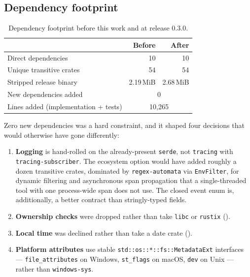 \documentclass[11pt,a4paper]{article}
\newcommand{\code}[1]{\texttt{\small #1}}
\begin{document}
\subsection{Dependency footprint}
\label{sec:eval:deps}

\begin{table}[t]
\centering
\small
\caption{Dependency footprint before this work and at release 0.3.0.}
\label{tab:deps}
\begin{tabular}{@{}l r r@{}}
\toprule
 & \textbf{Before} & \textbf{After} \\
\midrule
Direct dependencies            & 10 & 10 \\
Unique transitive crates       & 54 & 54 \\
Stripped release binary        & 2.19\,MiB & 2.68\,MiB \\
New dependencies added         & \multicolumn{2}{c}{0} \\
Lines added (implementation + tests) & \multicolumn{2}{c}{10{,}265} \\
\bottomrule
\end{tabular}
\end{table}

Zero new dependencies was a hard constraint, and it shaped four decisions that would
otherwise have gone differently:

\begin{enumerate}[leftmargin=1.6em,itemsep=0.2em]
  \item \textbf{Logging} is hand-rolled on the already-present \code{serde}, not
    \code{tracing} with \code{tracing-subscriber}. The ecosystem option would have
    added roughly a dozen transitive crates, dominated by \code{regex-automata} via
    \code{EnvFilter}, for dynamic filtering and asynchronous span propagation that a
    single-threaded tool with one process-wide span does not use. The closed event
    enum is, additionally, a better contract than stringly-typed fields.
  \item \textbf{Ownership checks} were dropped rather than take \code{libc} or
    \code{rustix} ().
  \item \textbf{Local time} was declined rather than take a date crate
    ().
  \item \textbf{Platform attributes} use stable \code{std::os::*::fs::MetadataExt}
    interfaces --- \code{file\_attributes} on Windows, \code{st\_flags} on macOS,
    \code{dev} on Unix --- rather than \code{windows-sys}.
\end{enumerate}
\end{document}
